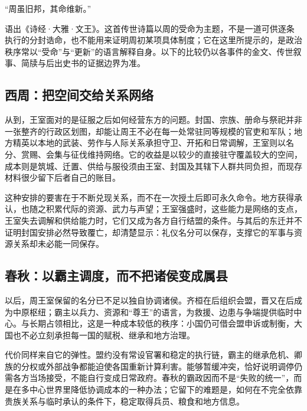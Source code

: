 \begin{textwindow}[《诗经》里的“维新”]
“周虽旧邦，其命维新。”

语出《诗经·大雅·文王》。这首传世诗篇以周的受命为主题，不是一道可供逐条执行的分封诰命，也不能用来证明周初某项具体制度；它在这里所提示的，是政治秩序常以“受命”与“更新”的语言解释自身。以下的比较仍以各事件的金文、传世叙事、简牍与后出史书的证据边界为准。
\end{textwindow}

\subsection{西周：把空间交给关系网络}

从到，王室面对的是征服之后如何经营东方的问题。封国、宗族、册命与祭祀并非一张整齐的行政区划图，却能让周王不必在每一处常驻同等规模的官吏和军队；地方精英以本地的武装、劳作与人际关系承担守卫、开拓和日常调解，王室则以名分、赏赐、会集与征伐维持网络。它的收益是以较少的直接驻守覆盖较大的空间，成本则是筑城、迁置、供给与服役须由王室、封国及其辖下人群共同负担，而现存材料很少留下后者自己的账目。

这种安排的要害在于不断兑现关系，而不在一次授土后即可永久命令。地方获得承认，也随之积累代际的资源、武力与声望；王室强盛时，这些能力是网络的支点，王室失去调解和供给能力时，它们又成为各方自行结盟的条件。与其后的东迁并不证明封国安排必然导致覆亡，却清楚显示：礼仪名分可以保存，支撑它的军事与资源关系却未必能一同保存。

\subsection{春秋：以霸主调度，而不把诸侯变成属县}

以后，周王室保留的名分已不足以独自协调诸侯。齐桓在后组织会盟，晋又在后成为中原枢纽；霸主以兵力、资源和“尊王”的语言，为救援、边患与争端提供临时中心。与长期占领相比，这是一种成本较低的秩序：小国仍可借会盟申诉或制衡，大国也不必立刻承担每一国的赋税、继承和地方治理。

代价同样来自它的弹性。盟约没有常设官署和稳定的执行链，霸主的继承危机、卿族的分权或外部战争都能迫使各国重新计算利害。能够暂缓冲突，恰好说明调停仍需各方当场接受，不能自行变成日常政府。春秋的霸政因而不是“失败的统一”，而是在多中心世界里降低协调成本的一种办法；它留下的难题是，如何在不完全依靠贵族关系与临时承认的条件下，稳定取得兵员、粮食和地方信息。

